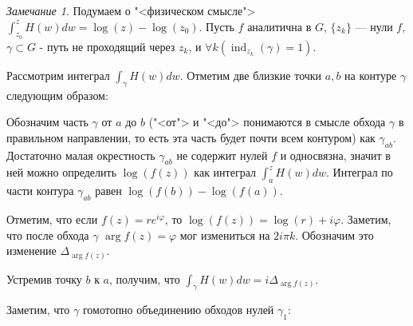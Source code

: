 \documentclass[12pt]{article}
\newcommand{\ind}{\mathbbm{1}}
\renewcommand{\ind}{\operatorname{ind}}
\theoremstyle{thmnote}
\theoremstyle{remark}
\newtheorem*{remark}{Замечание}
\theoremstyle{defnote}
\begin{document}
\begin{remark}
    Подумаем о "<физическом смысле"> $\int_{z_0}^{z} H(w) dw = \log(z) - \log(z_0)$. Пусть $f$ аналитична в $G$, $\{z_k\}$ --- нули $f$, $\gamma \subset G$ - путь не проходящий через $z_k$, и $\forall k (\ind_{z_k}(\gamma) = 1)$.

    Рассмотрим интеграл $\int_\gamma H(w) dw$. Отметим две близкие точки $a, b$ на контуре $\gamma$ следующим образом:

    \begin{center}
    \end{center}

    Обозначим часть $\gamma$ от $a$ до $b$ ("<от"> и "<до"> понимаются в смысле обхода $\gamma$ в правильном направлении, то есть эта часть будет почти всем контуром) как $\gamma_{ab}$. Достаточно малая окрестность $\gamma_{ab}$ не содержит нулей $f$ и односвязна, значит в ней можно определить $\log(f(z))$ как интеграл $\int_{a}^{z} H(w) dw$. Интеграл по части контура $\gamma_{ab}$ равен $\log(f(b)) - \log(f(a))$. 
    
    Отметим, что если $f(z) = r e^{i \varphi}$, то $\log(f(z)) = \log(r) + i \varphi$. Заметим, что после обхода $\gamma$ $\arg f(z) = \varphi$ мог измениться на $2 i \pi k$. Обозначим это изменение $\Delta_{\arg f(z)}$.   
    
    Устремив точку $b$ к $a$, получим, что $\int_\gamma H(w) dw = i \Delta_{\arg f(z)}$.

    Заметим, что $\gamma$ гомотопно объединению обходов нулей $\gamma_1$:


\end{remark}
\end{document}
